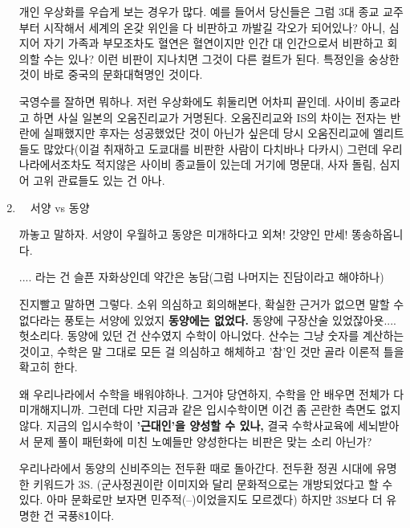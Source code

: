 \begin{enumerate}
개인 우상화를 우습게 보는 경우가 많다.
예를 들어서 당신들은 그럼 3대 종교 교주부터 시작해서 세계의 온갖 위인을 다 비판하고 까발길 각오가 되어있나?
아니, 심지어 자기 가족과 부모조차도 혈연은 혈연이지만 인간 대 인간으로서 비판하고 회의할 수는 있나?
이런 비판이 지나치면 그것이 다른 컬트가 된다.
특정인을 숭상한 것이 바로 중국의 문화대혁명인 것이다.
\vspace{5mm}

국영수를 잘하면 뭐하나. 저런 우상화에도 휘둘리면 어차피 끝인데.
사이비 종교라고 하면 사실 일본의 오움진리교가 거명된다. 오움진리교와 IS의 차이는
전자는 반란에 실패했지만 후자는 성공했었단 것이 아닌가 싶은데
당시 오움진리교에 엘리트들도 많았다(이걸 취재하고 도쿄대를 비판한 사람이 다치바나 다카시)
그런데 우리나라에서조차도 적지않은 사이비 종교들이 있는데 거기에 명문대, 사자 돌림, 심지어 고위 관료들도 있는 건 아나.
\vspace{5mm}

\item   서양 vs 동양
\vspace{5mm}

까놓고 말하자. 서양이 우월하고 동양은 미개하다고 외쳐!
갓양인 만세! 똥송하옵니다.
\vspace{5mm}

.... 라는 건 슬픈 자화상인데 약간은 농담(그럼 나머지는 진담이라고 해야하나)
\vspace{5mm}

진지빨고 말하면 그렇다.
소위 의심하고 회의해본다, 확실한 근거가 없으면 말할 수 없다라는 풍토는 서양에 있었지 \textbf{동양에는 없었다.}
동양에 구장산술 있었잖아욧.... 헛소리다. 동양에 있던 건 산수였지 수학이 아니었다.
산수는 그냥 숫자를 계산하는 것이고, 수학은 말 그대로 모든 걸 의심하고 해체하고 '참'인 것만 골라 이론적 틀을 확고히 한다.
\vspace{5mm}

왜 우리나라에서 수학을 배워야하나. 그거야 당연하지, 수학을 안 배우면 전체가 다 미개해지니까.
그런데 다만 지금과 같은 입시수학이면 이건 좀 곤란한 측면도 없지 않다. 지금의 입시수학이 \textbf{'근대인'을 양성할 수 있나,}
결국 수학사교육에 세뇌받아서 문제 풀이 패턴화에 미친 노예들만 양성한다는 비판은 맞는 소리 아닌가?
\vspace{5mm}

우리나라에서 동양의 신비주의는 전두환 때로 돌아간다. 전두환 정권 시대에 유명한 키워드가 3S.
(군사정권이란 이미지와 달리 문화적으로는 개방되었다고 할 수 있다. 아마 문화로만 보자면 민주적(--)이었을지도 모르겠다)
하지만 3S보다 더 유명한 건 국풍8\textbf{1}이다.
\vspace{5mm}


\end{enumerate}
